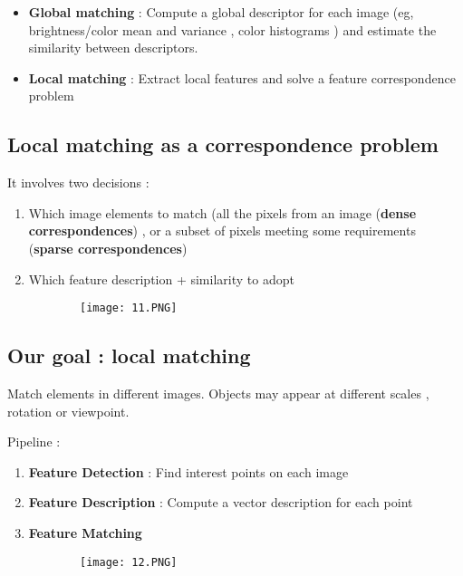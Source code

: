 \documentclass{article}
\begin{document}
\begin{itemize}
    \item \textbf{Global matching} : Compute a global descriptor for each image (eg, brightness/color mean and variance , color histograms ) and estimate the similarity between descriptors.
    \item \textbf{Local matching} : Extract local features and solve a feature correspondence problem
\end{itemize}

\subsection{Local matching as a correspondence problem}

It involves two decisions : 

\begin{enumerate}
    \item Which image elements to match (all the pixels from an image (\textbf{dense correspondences}) , or a subset of pixels meeting some requirements (\textbf{sparse correspondences})
    \item Which feature description + similarity to adopt
\end{enumerate}

\begin{figure}[ht!]
  \centering
  \begin{subfigure}[b]{0.5\linewidth}
    \texttt{[image: 11.PNG]}
  \end{subfigure}
\end{figure}

\subsection{Our goal : local matching}

Match elements in different images. Objects may appear at different scales , rotation or viewpoint.

Pipeline : 

\begin{enumerate}
    \item \textbf{Feature Detection} : Find interest points on each image
    \item \textbf{Feature Description} : Compute a vector description for each point
    \item \textbf{Feature Matching}
\end{enumerate}

\begin{figure}[ht!]
  \centering
  \begin{subfigure}[b]{0.5\linewidth}
    \texttt{[image: 12.PNG]}
  \end{subfigure}
\end{figure}
\end{document}
